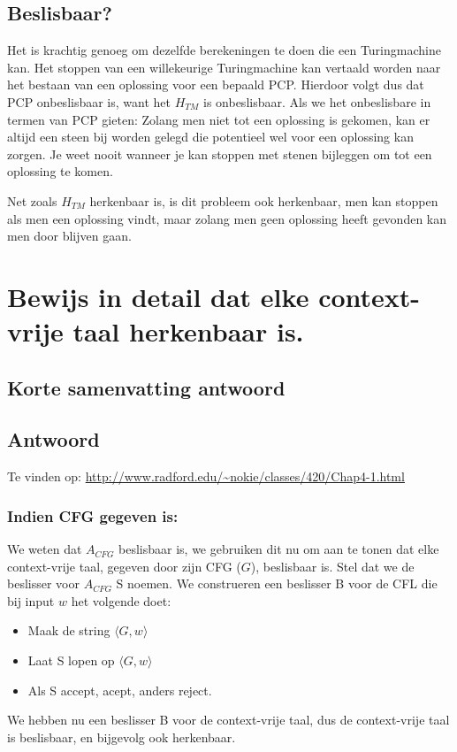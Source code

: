 \documentclass{article}
\begin{document}
        \subsection{Beslisbaar?}
            Het is krachtig genoeg om dezelfde berekeningen te doen die een Turingmachine kan. Het stoppen van een willekeurige Turingmachine kan vertaald worden naar het bestaan van een oplossing voor een bepaald PCP. Hierdoor volgt dus dat PCP onbeslisbaar is, want het $H_{TM}$ is onbeslisbaar. Als we het onbeslisbare in termen van PCP gieten: Zolang men niet tot een oplossing is gekomen, kan er altijd een steen bij worden gelegd die potentieel wel voor een oplossing kan zorgen. Je weet nooit wanneer je kan stoppen met stenen bijleggen om tot een oplossing te komen.

            Net zoals $H_{TM}$ herkenbaar is, is dit probleem ook herkenbaar, men kan stoppen als men een oplossing vindt, maar zolang men geen oplossing heeft gevonden kan men door blijven gaan.

\newpage
\section{Bewijs in detail dat elke context-vrije taal herkenbaar is.}
    
    \subsection{Korte samenvatting antwoord}
        
    \subsection{Antwoord}
        Te vinden op: \url{http://www.radford.edu/~nokie/classes/420/Chap4-1.html}
        \subsubsection{Indien CFG gegeven is:}
            We weten dat $A_{CFG}$ beslisbaar is, we gebruiken dit nu om aan te tonen dat elke context-vrije taal, gegeven door zijn CFG ($G$), beslisbaar is. Stel dat we de beslisser voor $A_{CFG}$ S noemen. We construeren een beslisser B voor de CFL die bij input $w$ het volgende doet:
            \begin{itemize}
                \item Maak de string $\langle G, w \rangle$
                \item Laat S lopen op $\langle G, w \rangle$
                \item Als S accept, acept, anders reject.
            \end{itemize}
            We hebben nu een beslisser B voor de context-vrije taal, dus de context-vrije taal is beslisbaar, en bijgevolg ook herkenbaar.
\end{document}
